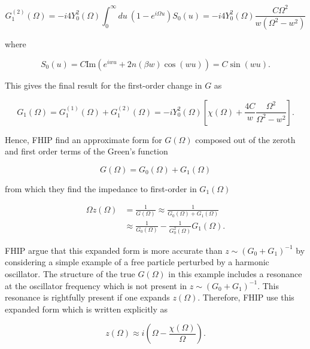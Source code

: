 \begin{equation}
    G^{(2)}_1(\Omega) = -i4Y_0^2(\Omega) \int^\infty_0 du\ \left(1 - e^{i\Omega u} \right) S_0(u) = -i4Y_0^2(\Omega) \frac{C \Omega^2}{w(\Omega^2 - w^2)}
\end{equation}

where

\begin{equation}
    S_0(u) = C \text{Im} \left( e^{iwu} + 2 n(\beta w) \cos(wu) \right) = C \sin(wu).
\end{equation}

This gives the final result for the first-order change in $G$ as

\begin{equation}
    G_1(\Omega) = G^{(1)}_1(\Omega) + G^{(2)}_1(\Omega) = -iY_0^2(\Omega) \left[ \chi(\Omega) + \frac{4C}{w} \frac{\Omega^2}{\Omega^2 - w^2} \right].
\end{equation}

Hence, FHIP find an approximate form for $G(\Omega)$ composed out of the zeroth and first order terms of the Green's function

\begin{equation}
    G(\Omega) = G_0(\Omega) + G_1(\Omega)
\end{equation}

from which they find the impedance to first-order in $G_1(\Omega)$

\begin{equation}
    \begin{aligned}
    \Omega z(\Omega) &= \frac{1}{G(\Omega)} \approx \frac{1}{G_0(\Omega) + G_1(\Omega)} \\
    &\approx \frac{1}{G_0(\Omega)} - \frac{1}{G_0^2(\Omega)} G_1(\Omega).
    \end{aligned}
\end{equation}

FHIP argue that this expanded form is more accurate than $z \sim (G_0 + G_1)^{-1}$ by considering a simple example of a free particle perturbed by a harmonic oscillator. The structure of the true $G(\Omega)$ in this example includes a resonance at the oscillator frequency which is not present in $z \sim (G_0 + G_1)^{-1}$. This resonance is rightfully present if one expands $z(\Omega)$. Therefore, FHIP use this expanded form which is written explicitly as

\begin{equation}\label{eqn:fhip_impedance}
    z(\Omega) \approx i\left(\Omega - \frac{\chi(\Omega)}{\Omega}\right).
\end{equation}

